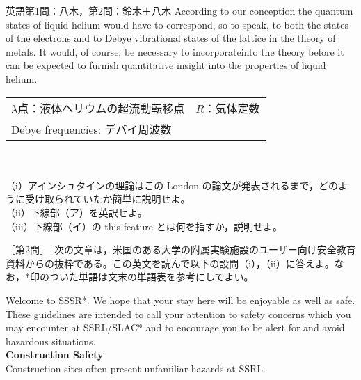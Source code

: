 \documentclass[fleqn]{jbook}
\begin{document}
\begin{question}{英語}{第1問：八木，第2問：鈴木＋八木}
\qquad According to our conception the quantum states of liquid helium would have to correspond, so to speak, to both the states of the electrons and to Debye vibrational states of the lattice in the theory of metals. It would, of course, be necessary to incorporateinto the theory before it can be expected to furnish quantitative insight into the properties of liquid helium.\\

\begin{tabular}{ll}
$\lambda$点：液体ヘリウムの超流動転移点 & $R$：気体定数\\
Debye frequencies: デバイ周波数
\end{tabular}
\\\\

（i）アインシュタインの理論はこの London の論文が発表されるまで，どのように受け取られていたか簡単に説明せよ。\\
 
（ii）下線部（ア）を英訳せよ。\\
 
（iii）下線部（イ）の this feature とは何を指すか，説明せよ。


\newpage





［第2問］　次の文章は，米国のある大学の附属実験施設のユーザー向け安全教育資料からの抜粋である。この英文を読んで以下の設問（i），（ii）に答えよ。なお，*印のついた単語は文末の単語表を参考にしてよい。\\

\baselineskip=12pt

Welcome to SSSR*. We hope that your stay here will be enjoyable 
as well as safe. These guidelines are intended to call your attention 
to safety concerns which you may encounter at SSRL/SLAC* and to 
encourage you to be alert for and avoid hazardous situations.\\

{\bf Construction Safety}\\
Construction sites often present unfamiliar hazards at SSRL. 
 \\


\end{question}
\end{document}
